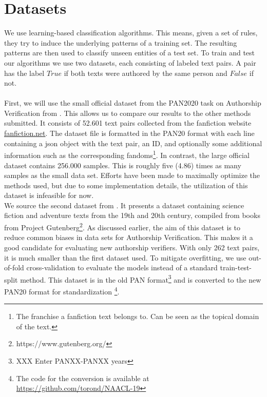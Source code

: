 \section{Datasets}
We use learning-based classification algorithms.
This means, given a set of rules, they try to induce the underlying patterns of a training set.
The resulting patterns are then used to classify unseen entities of a test set.
To train and test our algorithms we use two datasets, each consisting of labeled text pairs.
A pair has the label $True$ if both texts were authored by the same person and $False$ if not.\\\\
First, we will use the small official dataset from the PAN2020 task on Authorship Verification from \cite{bevendorff2020overview}.
This allows us to compare our results to the other methods submitted.
It consists of 52.601 text pairs collected from the fanfiction website \url{fanfiction.net}.
The dataset file is formatted in the PAN20 format with each line containing a json object with the text pair, an ID, and optionally some additional information such as the corresponding fandoms\footnote{The franchise a fanfiction text belongs to. Can be seen as the topical domain of the text.}.
In contrast, the large official dataset contains 256.000 samples.
This is roughly five (4.86) times as many samples as the small data set.
Efforts have been made to maximally optimize the methods used, but due to some implementation details, the utilization of this dataset is infeasible for now.\\
We source the second dataset from \cite{stein2019unbiasedGutenbergCorpus}.
It presents a dataset containing science fiction and adventure texts from the 19th and 20th century, compiled from books from Project Gutenberg\footnote{https://www.gutenberg.org/}.
As discussed earlier, the aim of this dataset is to reduce common biases in data sets for Authorship Verification.
This makes it a good candidate for evaluating new authorship verifiers.
With only 262 text pairs, it is much smaller than the first dataset used.
To mitigate overfitting, we use out-of-fold cross-validation to evaluate the models instead of a standard train-test-split method.
This dataset is in the old PAN format\footnote{XXX Enter PANXX-PANXX years} and is converted to the new PAN20 format for standardization \footnote{The code for the conversion is available at \url{https://github.com/torond/NAACL-19}}.\\

